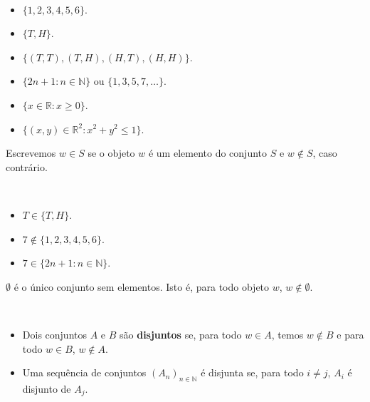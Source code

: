   \begin{example}[Conjuntos] \
  
    \begin{itemize}
     \item {} $\{1,2,3,4,5,6\}$.
     \item {} $\{T,H\}$.
     \item {} $\{(T,T),(T,H),(H,T),(H,H)\}$.
     \item {} $\{2n+1: n \in \mathbb{N}\}$ ou  $\{1, 3, 5, 7, \ldots\}$.
     \item {} $\{x \in \mathbb{R}: x \geq 0\}$.
     \item {} $\{(x,y) \in \mathbb{R}^2: x^2+y^2 \leq 1\}$.
    \end{itemize}
  \end{example}

  \begin{definition}[$\in$ e $\notin$] 
    \label{def:membership}
    Escrevemos $w \in S$ se o objeto $w$ é um elemento do conjunto $S$ e $w \notin S$, caso contrário.
  \end{definition}

  \begin{example}[$\in$ e $\notin$] \
  \begin{itemize}
    \item $T \in \{T, H\}$. 
    \item $7 \notin \{1,2,3,4,5,6\}$.
    \item $7 \in \{2n+1: n \in \mathbb{N}\}$.
  \end{itemize}
  \end{example}

  \begin{definition}
    \label{emptyset}
    $\emptyset$ é o único conjunto sem elementos. Isto é, para todo objeto $w$, $w \notin \emptyset$.
  \end{definition}
    
  \begin{definition} \
    \label{disjointsets}
    \begin{itemize}
     \item Dois conjuntos $A$ e $B$ são \textbf{disjuntos} se, 
		  para todo $w \in A$, temos $w \notin B$ e 
			para todo $w \in B$, $w \notin A$.
     \item Uma sequência de conjuntos $(A_{n})_{n \in \mathbb{N}}$ é disjunta se, 
		  para todo $i \neq j$, $A_{i}$ é disjunto de $A_{j}$.
    \end{itemize}
  \end{definition}
  

